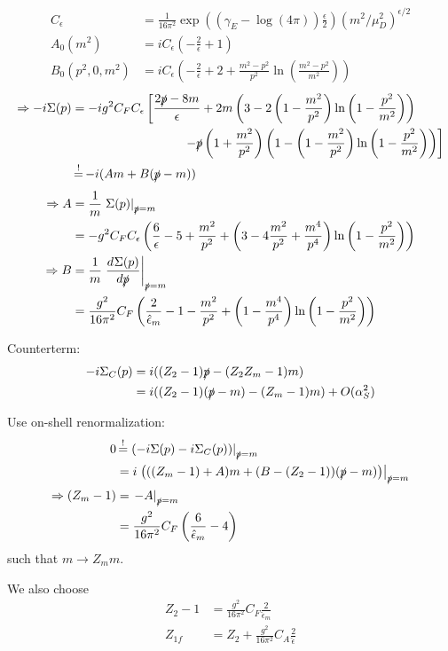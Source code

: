 \begin{align}
C_\epsilon &= \frac 1 {16\pi^2}\exp\left(\left(\gamma_E-\log(4\pi)\right)\frac{\epsilon} 2\right)\left(m^2/\mu_D^2\right)^{\epsilon/2}\\
A_0(m^2) &=iC_\epsilon\left(-\frac 2 {\epsilon}+1\right)\\
B_0(p^2,0,m^2) &=iC_\epsilon\left(-\frac 2{\epsilon}+2+\frac{m^2-p^2}{p^2}\ln\left(\frac{m^2-p^2}{m^2}\right)\right)
\end{align}
\begin{align}
\Rightarrow-i\Sigma(p) &= -ig^2C_FC_\epsilon\left[\frac{2\slashed{p}-8m}{\epsilon}+2m\left(3-2\left(1-\frac{m^2}{p^2}\right)\ln\left(1-\frac{p^2}{m^2}\right)\right)\right.\nonumber\\
 &\hspace{90pt}\left.-\slashed{p}\left(1+\frac{m^2}{p^2}\right)\left(1-\left(1-\frac{m^2}{p^2}\right)\ln\left(1-\frac{p^2}{m^2}\right)\right)\right]\\
 &\EqualClaim -i(A m + B(\slashed p - m))
\end{align}
\begin{align}
\Rightarrow A &= \frac 1 m \left.\Sigma(p)\right|_{\slashed{p}=m} \\
 &= -g^2C_F C_\epsilon\left(\frac 6 \epsilon -5 +\frac{m^2}{p^2}+\left(3-4\frac{m^2}{p^2}+\frac{m^4}{p^4}\right)\ln\left(1-\frac{p^2}{m^2}\right)\right)\\
\Rightarrow B &= \frac 1 m \left.\DeriveF{\slashed{p}}{\Sigma(p)}\right|_{\slashed{p}=m} \\
 &= \frac{g^2}{16\pi^2}C_F \left(\frac 2 {\hat\epsilon_m} -1-\frac{m^2}{p^2}+\left(1-\frac{m^4}{p^4}\right)\ln\left(1-\frac{p^2}{m^2}\right)\right)
\end{align}

Counterterm:
\begin{align}
-i\Sigma_C(p) &=i((Z_2-1)\slashed{p}-(Z_2 Z_m -1) m)\\
 &= i((Z_2-1)(\slashed p - m) - (Z_m-1)m) + O(\alpha_S^2)
\end{align}

Use on-shell renormalization:
\begin{align}
0 &\EqualClaim \left.\left(-i\Sigma(p)-i\Sigma_C(p)\right)\right|_{\slashed{p}=m}\\
 &= i\left.\left(((Z_m-1)+A)m+(B-(Z_2-1))(\slashed p - m)\right)\right|_{\slashed{p}=m} \\
\Rightarrow (Z_m-1) &= \left.-A\right|_{\slashed{p}=m}\\
 &= \frac{g^2}{16\pi^2}C_F \left(\frac 6 {\hat \epsilon_m} -4\right)
\end{align}
such that $m\rightarrow Z_m m$.

We also choose
\begin{align}
Z_2-1 &= \frac{g^2}{16\pi^2}C_F \frac 2 {\hat \epsilon_m}\\
Z_{1f} &= Z_2 + \frac{g^2}{16\pi^2}C_A\frac 2 {\hat \epsilon}
\end{align}
